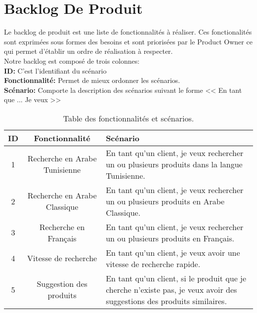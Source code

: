 \section{Backlog De Produit}
\noindent
\large
Le backlog de produit est une liste de fonctionnalités à réaliser. Ces fonctionalités sont exprimées sous formes des besoins et sont priorisées par le Product Owner ce qui permet d'établir un ordre de réalisation à respecter. \\
Notre backlog est composé de trois colonnes: \\
\textbf{ID: } C'est l'identifiant du scénario \\
\textbf{Fonctionnalité: } Permet de mieux ordonner les scénarios. \\
\textbf{Scénario: } Comporte la description des scénarios suivant le forme << En tant que ... Je veux >> \\

\begin{table}[H]
\centering
\begin{tabular}{|c|c|p{10cm}|}
\hline
\rowcolor{blue!20}
\textbf{ID} & \textbf{Fonctionnalité} & \textbf{Scénario} \\ \hline
1 & Recherche en Arabe Tunisienne  & En tant qu'un client, je veux rechercher un ou plusieurs produits dans la langue Tunisienne. \\ \hline
2 & Recherche en Arabe Classique & En tant qu'un client, je veux rechercher un ou plusieurs produits en Arabe Classique. \\ \hline
3 & Recherche en Français & En tant qu'un client, je veux rechercher un ou plusieurs produits en Français. \\ \hline
4 & Vitesse de recherche & En tant qu'un client, je veux avoir une vitesse de recherche rapide. \\ \hline
5 & Suggestion des produits & En tant qu'un client, si le produit que je cherche n'existe pas, je veux avoir des suggestions des produits similaires. \\ \hline
\end{tabular}
\caption{Table des fonctionnalités et scénarios.}
\end{table}